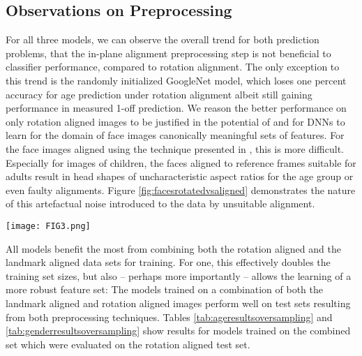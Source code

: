 \documentclass[10pt,twocolumn,letterpaper]{article}
\begin{document}
\subsection{Observations on Preprocessing}
For all three models, we can observe the overall trend for both prediction problems, that the in-plane alignment preprocessing step is not beneficial to classifier performance, compared to rotation alignment.
The only exception to this trend is the randomly initialized GoogleNet model, which loses one percent accuracy for age prediction under rotation alignment albeit still gaining performance in measured 1-off prediction. We reason the better performance on only rotation aligned images to be justified in the potential of and for DNNs to learn for the domain of face images canonically meaningful sets of features. For the face images aligned using the technique presented in \cite{eidinger2014age}, this is more difficult. Especially for images of children, the faces aligned to reference frames suitable for adults result in head shapes of uncharacteristic aspect ratios for the age group or even faulty alignments.
Figure \ref{fig:facesrotatedvsaligned} demonstrates the nature of this artefactual noise introduced to the data by unsuitable alignment.
\begin{figure*}
\begin{center}
\texttt{[image: FIG3.png]}
\end{center}
	\caption{
Top: Samples taken from the only rotation aligned variant of the Adience data set. Bottom: In-plane aligned samples. The left five image pairs show faces taken from the age group of (0-2) which are classified correctly under rotation alignment and are placed at least one age group above by the predictor under landmark-based alignment, with the middle image to the left being predicted as age group (8-13) by the GoogleNet. The in-plane alignment technique applied to one variant of the Adience data set tends to elongate faces vertically. The remaining image show misclassified and misaligned samples picked at random.}
	\label{fig:facesrotatedvsaligned}
\end{figure*}

All models benefit the most from combining both the rotation aligned and the landmark aligned data sets for training.
For one, this effectively doubles the training set sizes,
but also -- perhaps more importantly -- allows the learning of a more robust feature set:
The models trained on a combination of both the landmark aligned and rotation aligned images perform well on test sets resulting from both preprocessing techniques.
Tables \ref{tab:ageresultsoversampling} and \ref{tab:genderresultsoversampling} show results for models trained on the combined set which were evaluated on the rotation aligned test set.
\end{document}

